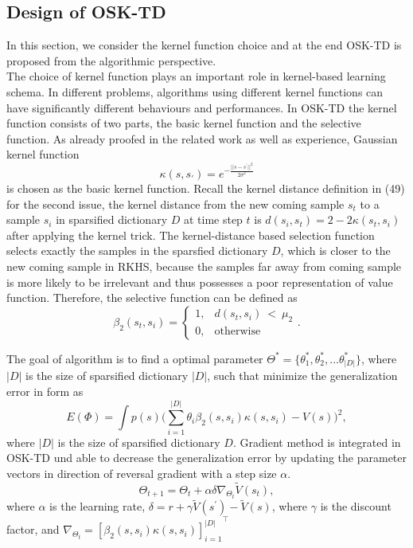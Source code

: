\documentclass[conference]{IEEEtran}
\begin{document}
\subsection{Design of OSK-TD}
In this section, we consider the kernel function choice and at the end OSK-TD is proposed from the algorithmic  perspective.\\

The choice of kernel function plays an important role in kernel-based learning schema. In different problems, algorithms using different kernel functions can  have significantly different behaviours and performances. In OSK-TD the kernel function consists of two parts, the basic kernel function and the selective function. As already proofed in the related work as well as experience, Gaussian kernel function 
\begin{equation}
	\kappa(s, s_{'}) = e^{-\frac{||s-s^{'}||^2}{2\sigma^2}}
\end{equation}
is chosen as the basic kernel function. Recall the kernel distance definition in (49) for the second issue, the kernel distance from the new coming sample $s_t$ to a sample $s_i$ in sparsified dictionary $D$ at time step $t$ is $d(s_i, s_t)=2-2\kappa(s_t, s_i)$ after applying the kernel trick. The kernel-distance based selection function selects exactly the samples in the sparsfied dictionary $D$, which is closer to the new coming sample in RKHS, because the samples far away from coming sample is more likely to be irrelevant and thus possesses a poor representation of value function. Therefore, the selective function can be defined as
\begin{equation}
  \beta_2(s_t, s_i) =
      \begin{cases}
			1,& d(s_t, s_i)\ <\ \mu_2\\
           	0, & \text{otherwise}
      \end{cases}.
\end{equation}

The goal of algorithm is to find a optimal parameter $\Theta^* =\{\theta_1^*, \theta_2^*,...\theta_{|D|}^*\}$, where $|D|$ is the size of sparsified dictionary $|D|$, such that minimize the generalization error in form as
\begin{equation}
	E(\Phi)=\int p(s)\bigg(\sum_{i=1}^{|D|}\theta_i\beta_2(s, s_i)\kappa(s, s_i)-V(s)\bigg)^2,
\end{equation}
where $|D|$ is the size of sparsified dictionary $D$. Gradient method is integrated in OSK-TD und able to decrease the generalization error by updating the parameter vectors in direction of reversal gradient with a step size $\alpha$.\\
\begin{equation}
	\Theta_{t+1} =\Theta_t + \alpha\delta\nabla_{\Theta_t}\widetilde{V}(s_t) ,
\end{equation}
where $\alpha$ is the learning rate, $\delta=r+\gamma \widetilde{V}(s^{'})-\widetilde{V}(s)$, where $\gamma$ is the discount factor, and 
$\nabla_{\Theta_t}={[\beta_2(s, s_i)\kappa(s, s_i)]^{|D|}_{i=1}}^\top$\\
\end{document}
